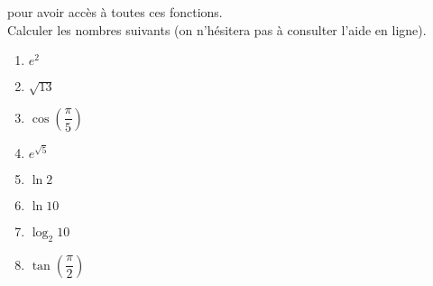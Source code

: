 pour avoir accès à toutes ces fonctions. \\
Calculer les nombres suivants (on n'hésitera pas à consulter l'aide en ligne).
\begin{multicols}{3}
  \begin{enumerate}[label=\emph{\alph*)}]
    \item $e^2$
    \item $\sqrt{13}$
    \item $\cos\left(\dfrac{\pi}{5}\right)$
    \item $e^{\sqrt{5}}$
    \item $\ln 2$
    \item $\ln 10$
    \item $\log_{2} 10$
    \item $\tan\left(\dfrac{\pi}{2}\right)$
  \end{enumerate}
\end{multicols}

